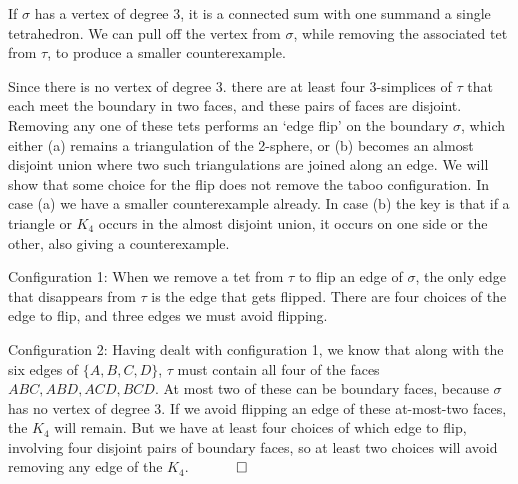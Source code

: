 \documentclass[12pt]{article}
\newcommand{\proofend}{$\quad \qed$}
\begin{document}
If $\sigma$ has a vertex of degree 3,
it is a connected sum with one summand a single tetrahedron.
We can pull off the vertex from $\sigma$, while removing the associated
tet from $\tau$, to produce a smaller counterexample.

Since there is no vertex of degree 3.
there are at least four 3-simplices of $\tau$ that each meet
the boundary in two faces, and these pairs of faces are disjoint.
Removing any one of these tets performs an `edge flip' on the boundary
$\sigma$,
which either (a) remains a triangulation of the 2-sphere,
or (b) becomes an almost disjoint union where
two such triangulations are joined along an edge.
We will show that some choice for the flip does not remove the taboo
configuration.
In case (a) we have a smaller counterexample already.
In case (b) the key is that if a triangle or $K_4$ occurs
in the almost disjoint union, it occurs on one side or the other,
also giving a counterexample.

Configuration 1:
When we remove a tet from $\tau$ to flip an edge of $\sigma$,
the only edge that disappears from $\tau$ is the edge that gets flipped.
There are four choices of the edge to flip, and three edges we must
avoid flipping.

Configuration 2:
Having dealt with configuration 1,
we know that along with the six edges of $\{A,B,C,D\}$,
$\tau$ must contain all four of the faces $ABC,ABD,ACD,BCD$.
At most two of these can be boundary faces, because
$\sigma$ has no vertex of degree 3.
If we avoid flipping an edge of these at-most-two faces,
the $K_4$ will remain.
But we have at least four choices of which edge to flip,
involving four disjoint pairs of boundary faces,
so at least two choices will avoid removing any edge of the $K_4$.
\proofend



\end{document}

